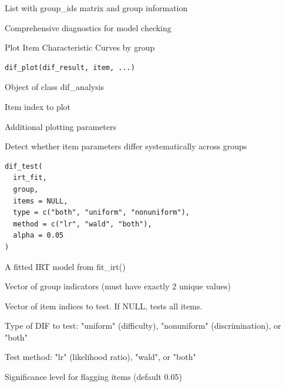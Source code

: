 \documentclass[a4paper]{book}
\begin{document}
%
\begin{Value}
List with group\_ids matrix and group information
\end{Value}
%
\begin{Description}
Comprehensive diagnostics for model checking
\end{Description}
%
\begin{Description}
Plot Item Characteristic Curves by group
\end{Description}
%
\begin{Usage}
\begin{verbatim}
dif_plot(dif_result, item, ...)
\end{verbatim}
\end{Usage}
%
\begin{Arguments}
\begin{ldescription}
\item[\code{dif\_result}] Object of class dif\_analysis

\item[\code{item}] Item index to plot

\item[\code{...}] Additional plotting parameters
\end{ldescription}
\end{Arguments}
%
\begin{Description}
Detect whether item parameters differ systematically across groups
\end{Description}
%
\begin{Usage}
\begin{verbatim}
dif_test(
  irt_fit,
  group,
  items = NULL,
  type = c("both", "uniform", "nonuniform"),
  method = c("lr", "wald", "both"),
  alpha = 0.05
)
\end{verbatim}
\end{Usage}
%
\begin{Arguments}
\begin{ldescription}
\item[\code{irt\_fit}] A fitted IRT model from fit\_irt()

\item[\code{group}] Vector of group indicators (must have exactly 2 unique values)

\item[\code{items}] Vector of item indices to test. If NULL, tests all items.

\item[\code{type}] Type of DIF to test: "uniform" (difficulty), "nonuniform" (discrimination), or "both"

\item[\code{method}] Test method: "lr" (likelihood ratio), "wald", or "both"

\item[\code{alpha}] Significance level for flagging items (default 0.05)
\end{ldescription}
\end{Arguments}
\end{document}
